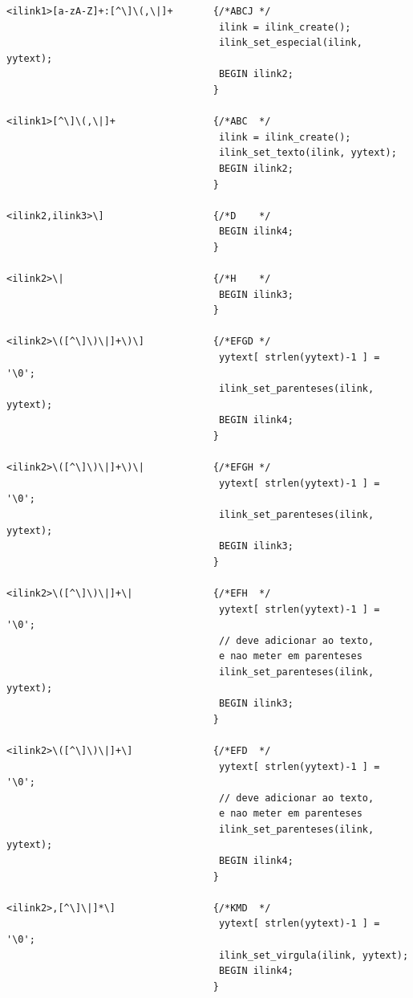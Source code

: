 \documentclass[11pt, a4paper, oneside]{article}
\begin{document}
\begin{verbatim}
<ilink1>[a-zA-Z]+:[^\]\(,\|]+       {/*ABCJ */
                                     ilink = ilink_create();
                                     ilink_set_especial(ilink, yytext);
                                     BEGIN ilink2;
                                    }

<ilink1>[^\]\(,\|]+                 {/*ABC  */
                                     ilink = ilink_create();
                                     ilink_set_texto(ilink, yytext);
                                     BEGIN ilink2;
                                    }

<ilink2,ilink3>\]                   {/*D    */
                                     BEGIN ilink4;
                                    }

<ilink2>\|                          {/*H    */
                                     BEGIN ilink3;
                                    }

<ilink2>\([^\]\)\|]+\)\]            {/*EFGD */
                                     yytext[ strlen(yytext)-1 ] = '\0';
                                     ilink_set_parenteses(ilink, yytext);
                                     BEGIN ilink4;
                                    }

<ilink2>\([^\]\)\|]+\)\|            {/*EFGH */
                                     yytext[ strlen(yytext)-1 ] = '\0';
                                     ilink_set_parenteses(ilink, yytext);
                                     BEGIN ilink3;
                                    }

<ilink2>\([^\]\)\|]+\|              {/*EFH  */
                                     yytext[ strlen(yytext)-1 ] = '\0';
                                     // deve adicionar ao texto, 
                                     e nao meter em parenteses
                                     ilink_set_parenteses(ilink, yytext);
                                     BEGIN ilink3;
                                    }

<ilink2>\([^\]\)\|]+\]              {/*EFD  */
                                     yytext[ strlen(yytext)-1 ] = '\0';
                                     // deve adicionar ao texto, 
                                     e nao meter em parenteses
                                     ilink_set_parenteses(ilink, yytext);
                                     BEGIN ilink4;
                                    }

<ilink2>,[^\]\|]*\]                 {/*KMD  */
                                     yytext[ strlen(yytext)-1 ] = '\0';
                                     ilink_set_virgula(ilink, yytext);
                                     BEGIN ilink4;
                                    }


\end{verbatim}
\end{document}
